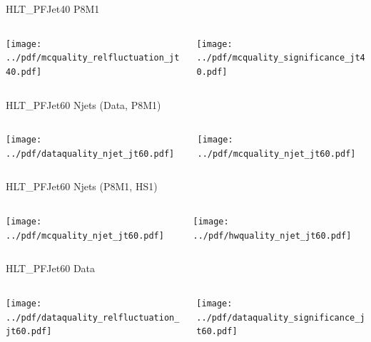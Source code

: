 \documentclass[9pt]{beamer}
\begin{document}
\begin{frame}[t]{HLT\_PFJet40 P8M1}
\begin{columns}[T]
  \begin{column}{.5\textwidth}
  \texttt{[image: ../pdf/mcquality\_relfluctuation\_jt40.pdf]}
  \end{column}
  \begin{column}{.5\textwidth}
  \texttt{[image: ../pdf/mcquality\_significance\_jt40.pdf]}
  \end{column}
\end{columns}
\end{frame}


\begin{frame}[t]{HLT\_PFJet60 Njets (Data, P8M1)}
\begin{columns}[T]
  \begin{column}{.5\textwidth}
  \texttt{[image: ../pdf/dataquality\_njet\_jt60.pdf]}
  \end{column}
  \begin{column}{.5\textwidth}
  \texttt{[image: ../pdf/mcquality\_njet\_jt60.pdf]}
  \end{column}
\end{columns}
\end{frame}

\begin{frame}[t]{HLT\_PFJet60 Njets (P8M1, HS1)}
\begin{columns}[T]
  \begin{column}{.5\textwidth}
  \texttt{[image: ../pdf/mcquality\_njet\_jt60.pdf]}
  \end{column}
  \begin{column}{.5\textwidth}
  \texttt{[image: ../pdf/hwquality\_njet\_jt60.pdf]}
  \end{column}
\end{columns}
\end{frame}

\begin{frame}[t]{HLT\_PFJet60 Data}
\begin{columns}[T]
  \begin{column}{.5\textwidth}
  \texttt{[image: ../pdf/dataquality\_relfluctuation\_jt60.pdf]}
  \end{column}
  \begin{column}{.5\textwidth}
  \texttt{[image: ../pdf/dataquality\_significance\_jt60.pdf]}
  \end{column}
\end{columns}
\end{frame}
\end{document}
